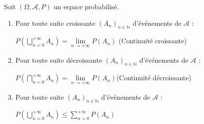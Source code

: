 \documentclass[a4paper,12pt]{book}
\newcommand{\Thr}[2]{\begin{tcolorbox}[sharp corners, colback=white,colframe=red!10!blue!30!green!75!, title=Théorème : #1]#2\end{tcolorbox}}
\def\N{\mathbb{N}}
\begin{document}
\Thr{}{Soit $(\Omega, \mathcal{A},P)$ un espace probabilisé.\begin{enumerate}
\item Pour toute suite croissante $(A_n)_{n\in\N}$ d'événements de $\mathcal{A}$ : \par\begin{center}$P\left(\bigcup_{n=0}^{+\infty}A_n\right)=\lim\limits_{n\to+\infty}P(A_n)$ (Continuité croissante)\end{center}
\item Pour toute suite décroissante $(A_n)_{n\in\N}$ d'événements de $\mathcal{A}$ : \par\begin{center}$P\left(\bigcap_{n=0}^{+\infty}A_n\right)=\lim\limits_{n\to+\infty}P(A_n)$(Continuité décroissante)\end{center}
\item Pour toute suite $(A_n)_{n\in\N}$ d'événements de $\mathcal{A}$ :\par\begin{center}$P\left(\bigcup_{n=0}^{+\infty}A_n\right)\leq\sum\limits_{n=0}^{+\infty}P(A_n)$\end{center}
\end{enumerate}}
\end{document}
